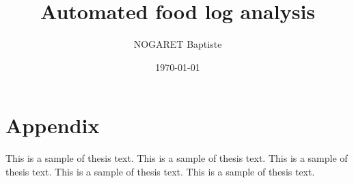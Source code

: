 \documentclass[12pt]{book}
\title{Automated food log analysis}
\author{NOGARET Baptiste}
\date{\today}
\begin{document}
\frontmatter

\maketitle





\sstableofcontents

\sslistoffigures

\sslistoftables





%
%
\mainmatter


















%
%
\appendix

\chapter{Appendix}

This is a sample of thesis text. This is a sample of thesis text. This is a 
sample of thesis text. This is a sample of thesis text. This is a sample of
thesis text.


\printbibliography
\end{document}
